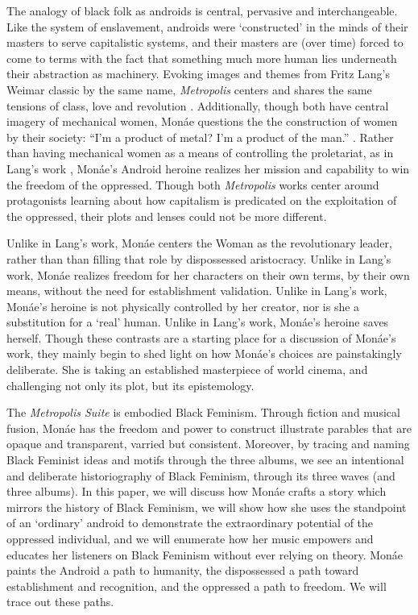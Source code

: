 \documentclass[a4paper, 11pt]{article} %
\begin{document}
The analogy of black folk as androids is central, pervasive and interchangeable. 
Like the system of enslavement, androids were `constructed' in the minds of their masters to serve capitalistic systems, and their masters are (over time) forced to come to terms with the fact that something much more human lies underneath their abstraction as machinery.
Evoking images and themes from Fritz Lang's Weimar classic by the same name, \emph{Metropolis} centers and shares the same tensions of class, love and revolution \cite{metropolis}.
Additionally, though both have central imagery of mechanical women, Mon\'ae questions the the construction of women by their society: ``I'm a product of metal? I'm a product of the man.'' \cite{happyhunting}. 
Rather than having mechanical women as a means of controlling the proletariat, as in Lang's work \cite{metropolis}, Mon\'ae's Android heroine realizes her mission and capability to win the freedom of the oppressed.
Though both \emph{Metropolis} works center around protagonists learning about how capitalism is predicated on the exploitation of the oppressed, their plots and lenses could not be more different.

Unlike in Lang's work, Mon\'ae centers the Woman as the revolutionary leader, rather than than filling that role by dispossessed aristocracy.
Unlike in Lang's work, Mon\'ae realizes freedom for her characters on their own terms, by their own means, without the need for establishment validation.
Unlike in Lang's work, Mon\'ae's heroine is not physically controlled by her creator, nor is she a substitution for a `real' human.
Unlike in Lang's work, Mon\'ae's heroine saves herself.
Though these contrasts are a starting place for a discussion of Mon\'ae's work, they mainly begin to shed light on how Mon\'ae's choices are painstakingly deliberate.
She is taking an established masterpiece of world cinema, and challenging not only its plot, but its epistemology.

The \emph{Metropolis Suite} is embodied Black Feminism.
Through fiction and musical fusion, Mon\'ae has the freedom and power to construct illustrate parables that are opaque and transparent, varried but consistent.
Moreover, by tracing and naming Black Feminist ideas and motifs through the three albums, we see an intentional and deliberate historiography of Black Feminism, through its three waves (and three albums).
In this paper, we will discuss how Mon\'ae crafts a story which mirrors the history of Black Feminism, we will show how she uses the standpoint of an `ordinary' android to demonstrate the extraordinary potential of the oppressed individual, and we will enumerate how her music empowers and educates her listeners on Black Feminism without ever relying on theory.
Mon\'ae paints the Android a path to humanity, the dispossessed a path toward establishment and recognition, and the oppressed a path to freedom.
We will trace out these paths. 
\end{document}
